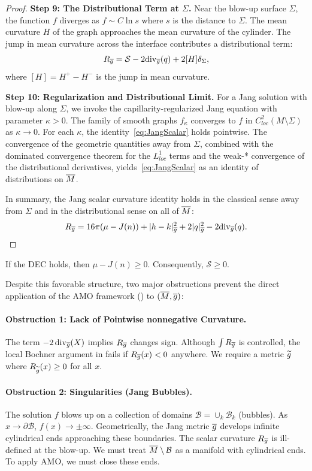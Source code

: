 \begin{proof}
\textbf{Step 9: The Distributional Term at $\Sigma$.}
Near the blow-up surface $\Sigma$, the function $f$ diverges as $f \sim C \ln s$ where $s$ is the distance to $\Sigma$. The mean curvature $H$ of the graph approaches the mean curvature of the cylinder. The jump in mean curvature across the interface contributes a distributional term:
\[
    R_{\overline{g}} = \mathcal{S} - 2\mathrm{div}_{\overline{g}}(q) + 2[H]\delta_\Sigma,
\]
where $[H] = H^+ - H^-$ is the jump in mean curvature.

\textbf{Step 10: Regularization and Distributional Limit.}
For a Jang solution with blow-up along $\Sigma$, we invoke the
capillarity-regularized Jang equation with parameter $\kappa > 0$. The family of smooth
graphs $f_\kappa$ converges to $f$ in $C^2_{loc}(M \setminus \Sigma)$ as $\kappa \to 0$. For each
$\kappa$, the identity~\eqref{eq:JangScalar} holds pointwise. The convergence of the geometric quantities away from $\Sigma$, combined with the dominated convergence theorem for the $L^1_{loc}$ terms and the weak-* convergence of the distributional derivatives, yields~\eqref{eq:JangScalar} as an identity of distributions on $\overline{M}$.

In summary, the Jang scalar curvature identity holds in the classical
sense away from $\Sigma$ and in the distributional sense on all of $\overline{M}$:
\[ R_{\overline{g}} = 16\pi(\mu - J(n)) + |h-k|^2_{\overline{g}} + 2|q|^2_{\overline{g}} - 2 \mathrm{div}_{\overline{g}}(q). \]
\end{proof}


If the DEC holds, then $\mu - J(n) \ge 0$. Consequently, $\mathcal{S} \ge 0$.

Despite this favorable structure, two major obstructions prevent the direct application of the AMO framework () to $(\overline{M}, \overline{g})$:

\paragraph{Obstruction 1: Lack of Pointwise nonnegative Curvature.}
The term $- 2 \, \mathrm{div}_{\overline{g}}(X)$ implies $R_{\overline{g}}$ changes sign. Although $\int R_{\overline{g}}$ is controlled, the local Bochner argument in  fails if $R_{\overline{g}}(x) < 0$ anywhere. We require a metric $\widetilde{g}$ where $R_{\widetilde{g}}(x) \ge 0$ for all $x$.

\paragraph{Obstruction 2: Singularities (Jang Bubbles).}
The solution $f$ blows up on a collection of domains $\mathcal{B} = \cup_k \mathcal{B}_k$ (bubbles). As $x \to \partial \mathcal{B}$, $f(x) \to \pm \infty$. Geometrically, the Jang metric $\overline{g}$ develops infinite cylindrical ends approaching these boundaries.
The scalar curvature $R_{\overline{g}}$ is ill-defined at the blow-up. We must treat $\overline{M} \setminus \mathcal{B}$ as a manifold with cylindrical ends. To apply AMO, we must close these ends.

